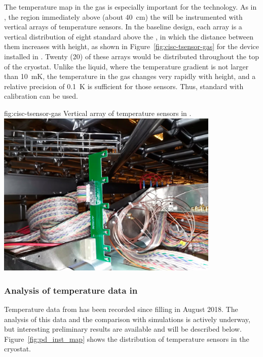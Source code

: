 The temperature map in the gas is especially important for the  technology. 
As in , the region immediately above (about \SI{40}{cm}) the  will be instrumented with vertical arrays of temperature sensors.  %
In the baseline design, each array is a vertical distribution of eight standard  above the , in which the distance between them increases with height, as shown in Figure~\ref{fig:cisc-tsensor-gas} for the device installed in .  Twenty (20) of these arrays would be distributed throughout the top of the cryostat. Unlike the liquid, where the temperature gradient is not larger than \SI{10}{mK}, the temperature in the gas changes very rapidly with height, and a relative precision of \SI{0.1}{K} is sufficient for those sensors. Thus, standard  with calibration can be used.    

\begin{dunefigure}{fig:cisc-tsensor-gas}
  {Vertical array of temperature sensors in .
  }
 \includegraphics[width=0.8\textwidth,angle=0]{graphics/cisc_dp_tsensor_gas}
\end{dunefigure}

\subsubsection{Analysis of temperature data in }
\label{sec:fdgen-slow-cryo-temp-ana}


Temperature data from  has been recorded since  filling %
in August 2018. The analysis of this data and the comparison with  simulations is actively underway, but interesting preliminary results are available and will be described below. Figure~\ref{fig:pd_inst_map} shows the distribution of temperature sensors in the  cryostat.  

